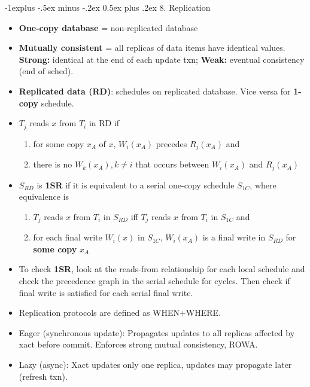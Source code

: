 \documentclass[8pt, landscape]{extarticle}
\makeatletter
\renewcommand{\subsection}{\@startsection{subsection}{2}{0mm}%
  {-1explus -.5ex minus -.2ex}%
  {0.5ex plus .2ex}%
{\normalfont\normalsize\bfseries}}
\makeatother
\begin{document}
\begin{multicols*}{4}
\subsection{8. Replication}

\begin{itemize}
    \item \textbf{One-copy database} = non-replicated database
    \item \textbf{Mutually consistent} = all replicas of data items have identical values. \\
    \textbf{Strong:} identical at the end of each update txn; \textbf{Weak:} eventual consistency (end of sched).
    \item \textbf{Replicated data (RD)}: schedules on replicated database. Vice versa for \textbf{1-copy} schedule.
    \item $T_j$ reads $x$ from $T_i$ in RD if
    \begin{enumerate}
        \item for some copy $x_A$ of $x$, $W_i(x_A)$ precedes $R_j(x_A)$ and
        \item there is no $W_k(x_A), k \neq i$ that occurs between $W_i(x_A)$ and $R_j(x_A)$
    \end{enumerate}
    \item $S_{RD}$ is \textbf{1SR} if it is equivalent to a serial one-copy schedule $S_{1C}$, where equivalence is
    \begin{enumerate}
        \item $T_j$ reads $x$ from $T_i$ in $S_{RD}$ iff $T_j$ reads $x$ from $T_i$ in $S_{1C}$ and
        \item for each final write $W_i(x)$ in $S_{1C}$, $W_i(x_A)$ is a final write in $S_{RD}$ for \textbf{some copy} $x_A$
    \end{enumerate}
    \item To check \textbf{1SR}, look at the reads-from relationship for each local schedule and check the precedence graph in the serial schedule for cycles. Then check if final write is satisfied for each serial final write.
    \item Replication protocols are defined as WHEN+WHERE.
    \item Eager (synchronous update): Propagates updates to all replicas affected by xact before commit. Enforces strong mutual consistency, ROWA.
    \item Lazy (async): Xact updates only one replica, updates may propagate later (refresh txn).
    \begin{itemize}

\end{itemize}
\end{itemize}
\end{multicols*}
\end{document}
